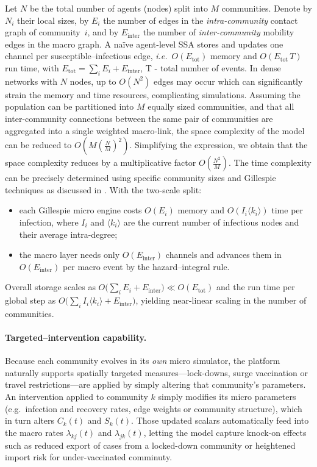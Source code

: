 \documentclass[
]{ceurart}
\begin{document}
Let $N$ be the total number of agents (nodes) split into $M$ communities.
Denote by $N_i$ their local sizes, by $E_i$ the number of edges in the
\emph{intra-community} contact graph of community~$i$, and by
$E_{\text{inter}}$ the number of \emph{inter-community} mobility edges
in the macro graph.  A naïve agent-level SSA stores and updates one
channel per susceptible–infectious edge, \emph{i.e.}\
$O(E_{\text{tot}})$ memory and $O(E_{\text{tot}}\,T)$ run time, with
$E_{\text{tot}}=\sum_i E_i+E_{\text{inter}}$, T - total number of events. 
In dense networks with $N$ nodes, up to $O(N^2)$ edges may occur which can significantly strain the memory and time resources, complicating simulations.
Assuming the population can be partitioned into \( M \) equally sized communities, and that all inter-community connections between the same pair of communities are aggregated into a single weighted macro-link, the space complexity of the model can be reduced to
$
O\left(M \left(\frac{N}{M}\right)^2\right).
$
Simplifying the expression, we obtain that the space complexity reduces by a multiplicative factor
$
O\left(\frac{N^2}{M}\right).
$
The time complexity can be precisely determined using specific community sizes and Gillespie techniques as discussed in \cite{kuryliak2025simulating}.
With the two-scale split:
\begin{itemize}
  \item each Gillespie micro engine costs $O(E_i)$ memory and
        $O(I_i\langle k_i\rangle)$ time per infection, where $I_i$ and
        $\langle k_i\rangle$ are the current number of infectious nodes
        and their average intra-degree;
  \item the macro layer needs only $O(E_{\text{inter}})$ channels and
        advances them in $O(E_{\text{inter}})$ per macro event by the
        hazard–integral rule.
\end{itemize}
Overall storage scales as
$O\!\bigl(\sum_i E_i+E_{\text{inter}}\bigr)\ll O(E_{\text{tot}})$ and
the run time per global step as
$O\!\bigl(\sum_i I_i\langle k_i\rangle+E_{\text{inter}}\bigr)$,
yielding near-linear scaling in the number of communities.

\paragraph{Targeted–intervention capability.}
Because each community evolves in its \emph{own} micro simulator, the platform
naturally supports spatially targeted
measures—lock-downs, surge vaccination or travel
restrictions—are applied by simply altering that community’s
parameters.  An intervention applied to community
\(k\) simply modifies its micro parameters (e.g.\ infection and recovery rates, edge weights or community structure), which in turn alters
\(C_k(t)\) and \(S_k(t)\).  Those updated scalars automatically feed into
the macro rates \(\lambda_{kj}(t)\) and \(\lambda_{jk}(t)\), letting the
model capture knock-on effects such as reduced export of cases
from a locked-down community or heightened import risk for
under-vaccinated comminuty.
\end{document}
